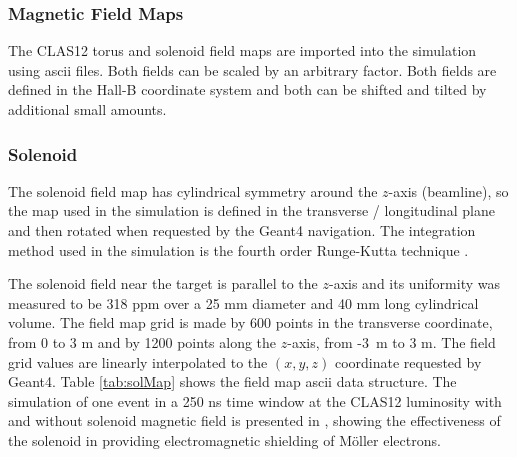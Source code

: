 \subsubsection{Magnetic Field Maps} \label{sec:clas12FieldMaps}

The CLAS12 torus and solenoid field maps are imported into the simulation using ascii files. Both fields can be scaled by an arbitrary factor.
Both fields are defined in the Hall-B coordinate system and both can be shifted and tilted by additional small amounts.

\subsubsection{Solenoid}
The solenoid field map has cylindrical symmetry around the $z$-axis (beamline), so the map used in the simulation is defined
in the transverse / longitudinal plane and then rotated when requested by the Geant4 navigation.
The integration method used in the simulation is the fourth order Runge-Kutta technique \cite{rungeKutta}.

The solenoid field near the target is parallel to the $z$-axis and its uniformity was measured to be 318 ppm over a 25 mm
diameter and 40 mm long cylindrical volume. The field map grid is made by 600 points in the transverse coordinate,
from 0 to 3 m and by 1200 points along the $z$-axis, from \mbox{-3 m} to 3 m.
The field grid values are linearly interpolated to the $(x,y,z)$ coordinate requested by Geant4.
Table \ref{tab:solMap} shows the field map ascii data structure. The simulation of one event in a 250 ns time window at
the CLAS12 luminosity with and without solenoid magnetic field is presented in , showing the effectiveness
of the solenoid in providing electromagnetic shielding of M\"oller electrons.

